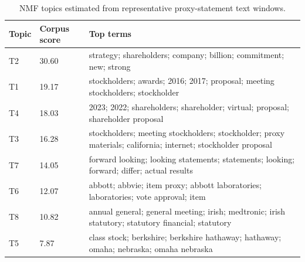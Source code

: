 \begin{table}[htbp]
\centering
\caption{NMF topics estimated from representative proxy-statement text windows.}
\label{tab:enhanced_nmf_topics}
\begin{tabular}{lll}
\hline
Topic & Corpus score & Top terms \\
\hline
T2 & 30.60 & strategy; shareholders; company; billion; commitment; new; strong \\
T1 & 19.17 & stockholders; awards; 2016; 2017; proposal; meeting stockholders; stockholder \\
T4 & 18.03 & 2023; 2022; shareholders; shareholder; virtual; proposal; shareholder proposal \\
T3 & 16.28 & stockholders; meeting stockholders; stockholder; proxy materials; california; internet; stockholder proposal \\
T7 & 14.05 & forward looking; looking statements; statements; looking; forward; differ; actual results \\
T6 & 12.07 & abbott; abbvie; item proxy; abbott laboratories; laboratories; vote approval; item \\
T8 & 10.82 & annual general; general meeting; irish; medtronic; irish statutory; statutory financial; statutory \\
T5 & 7.87 & class stock; berkshire; berkshire hathaway; hathaway; omaha; nebraska; omaha nebraska \\
\hline
\end{tabular}
\end{table}
